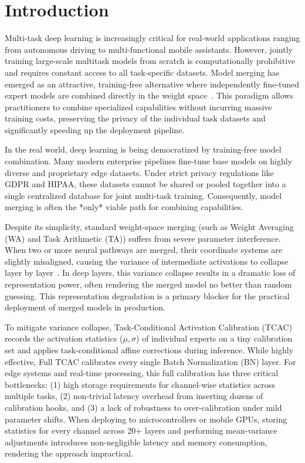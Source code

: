 \documentclass{article}
\theoremstyle{plain}
\theoremstyle{definition}
\theoremstyle{remark}
\begin{document}
\section{Introduction}
\label{sec:intro}
Multi-task deep learning is increasingly critical for real-world applications ranging from autonomous driving to multi-functional mobile assistants. However, jointly training large-scale multitask models from scratch is computationally prohibitive and requires constant access to all task-specific datasets. Model merging has emerged as an attractive, training-free alternative where independently fine-tuned expert models are combined directly in the weight space~\cite{wortsman2022model,ilharco2022editing}. This paradigm allows practitioners to combine specialized capabilities without incurring massive training costs, preserving the privacy of the individual task datasets and significantly speeding up the deployment pipeline.

In the real world, deep learning is being democratized by training-free model combination. Many modern enterprise pipelines fine-tune base models on highly diverse and proprietary edge datasets. Under strict privacy regulations like GDPR and HIPAA, these datasets cannot be shared or pooled together into a single centralized database for joint multi-task training. Consequently, model merging is often the *only* viable path for combining capabilities.

Despite its simplicity, standard weight-space merging (such as Weight Averaging (WA) and Task Arithmetic (TA)) suffers from severe parameter interference. When two or more neural pathways are merged, their coordinate systems are slightly misaligned, causing the variance of intermediate activations to collapse layer by layer~\cite{jordan2022repair}. In deep layers, this variance collapse results in a dramatic loss of representation power, often rendering the merged model no better than random guessing. This representation degradation is a primary blocker for the practical deployment of merged models in production.

To mitigate variance collapse, Task-Conditional Activation Calibration (TCAC)~\cite{tcac2026pragmatic} records the activation statistics ($\mu, \sigma$) of individual experts on a tiny calibration set and applies task-conditional affine corrections during inference. While highly effective, Full TCAC calibrates every single Batch Normalization (BN) layer. For edge systems and real-time processing, this full calibration has three critical bottlenecks: (1) high storage requirements for channel-wise statistics across multiple tasks, (2) non-trivial latency overhead from inserting dozens of calibration hooks, and (3) a lack of robustness to over-calibration under mild parameter shifts. When deploying to microcontrollers or mobile GPUs, storing statistics for every channel across 20+ layers and performing mean-variance adjustments introduces non-negligible latency and memory consumption, rendering the approach impractical.
\end{document}

